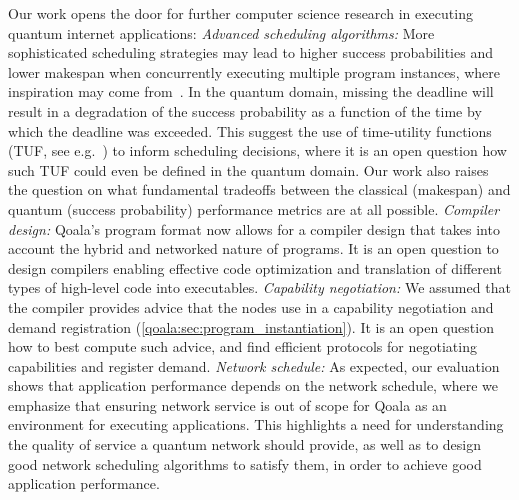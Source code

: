Our work opens the door for further computer science research in executing quantum internet applications:
\textit{Advanced scheduling algorithms:}
More sophisticated scheduling strategies may lead to higher success probabilities and lower makespan when concurrently executing multiple program instances, where inspiration may come from~\cite{topcuoglu2002performance, baruah2011scheduling, andersson2006multiprocessor, polychronopoulos1991hierarchical}. 
In the quantum domain, missing the deadline will result in a degradation of the success probability as a function of the time by which the deadline was exceeded.
This suggest the use of time-utility functions (TUF, see e.g.~\cite{jensen1993timeliness, li2004utility}) to inform scheduling decisions, where it is an open question how such TUF could even be defined in the quantum domain.
Our work also raises the question on what fundamental tradeoffs between the classical (makespan) and quantum (success probability) performance metrics are at all possible.
\textit{Compiler design:}
Qoala's program format now allows for a compiler design that takes into account the hybrid and networked nature of programs.
It is an open question to design compilers enabling effective code optimization and translation of different types of high-level code into executables.
\textit{Capability negotiation:}
We assumed that the compiler provides advice that the nodes use in a capability negotiation and demand registration (\cref{qoala:sec:program_instantiation}).
It is an open question how to best compute such advice, and find efficient protocols for negotiating capabilities and register demand.
\textit{Network schedule:}
As expected, our evaluation shows that application performance depends on the network schedule, where we emphasize that ensuring network service is out of scope for Qoala as an environment for executing applications.
This highlights a need for understanding the quality of service a quantum network should provide, as well as to design good network scheduling algorithms to satisfy them, in order to achieve good application performance.
